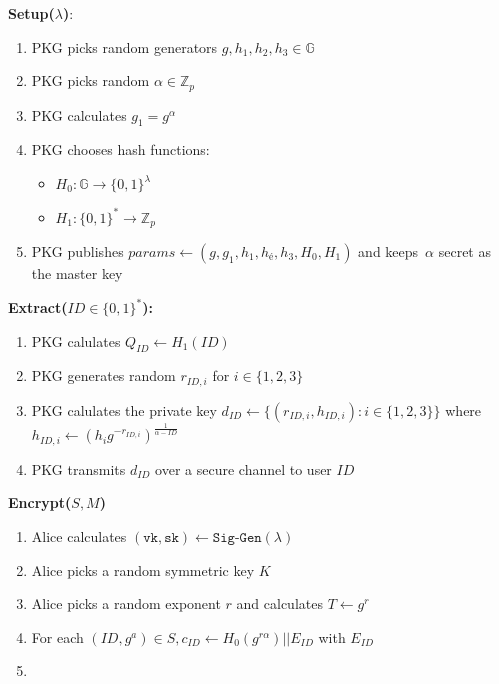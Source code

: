 \documentclass[12pt]{beamer}
\begin{document}
 
\begin{frame}{}
\textbf{Setup($\lambda$)}: 
\begin{enumerate}
 \item PKG picks random generators $g, h_1,h_2,h_3 \in \mathds{G}$
 \item PKG picks random $\alpha \in \mathds{Z}_p$
 \item PKG calculates $g_1=g^{\alpha}$
 \item PKG chooses hash functions:
 \begin{itemize}
   \item $H_0:\mathds{G} \rightarrow \{ 0 , 1 \}^{\lambda}$
   \item $H_1:\{ 0 , 1 \}^{*} \rightarrow \mathds{Z}_p$
  \end{itemize}
 \item PKG publishes $params \leftarrow \left( g,g_1,h_1,h_é,h_3,H_0,H_1 \right)$ and keeps~$\alpha$ secret as the master key
\end{enumerate}
\textbf{Extract($ID \in \{ 0, 1\}^{*}$):}
\begin{enumerate}
 \item PKG calulates $Q_{ID} \leftarrow H_1\left( ID \right)$
 \item PKG generates random $r_{ID,i}$ for $i \in \{ 1,2,3\}$
 \item PKG calulates the private key $d_{ID} \leftarrow \{ \left( r_{ID,i} , h_{ID,i} \right) : i \in \{ 1,2,3 \} \}$ where~$h_{ID,i} \leftarrow \left( h_i g^{-r_{ID,i}} \right)^\frac{1}{\alpha-ID}$
 \item PKG transmits $d_{ID}$ over a secure channel to user $ID$
\end{enumerate}
\end{frame}

\begin{frame}{}

\textbf{Encrypt($S,M$)}
\begin{enumerate}
 \item Alice calculates $\left( \texttt{vk},\texttt{sk} \right) \leftarrow \texttt{Sig-Gen} \left( \lambda \right) $
 \item Alice picks a random symmetric key $K$
 \item Alice picks a random exponent $r$ and calculates $T\leftarrow g^r$
 \item For each $\left( ID , g^a \right) \in S, c_{ID} \leftarrow H_0 \left( g^{r\alpha} \right)  || E_{ID}$ with $E_{ID}$
 \item 
\end{enumerate}

\end{frame}
\end{document}
